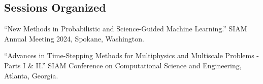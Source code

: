 \documentclass[11pt,letterpaper]{report}
\begin{document}



    \subsection*{Sessions Organized}

    \begin{tablist}

        \item[2024] \tab{}\enquote{New Methods in Probabilistic and Science-Guided Machine Learning.}
        SIAM Annual Meeting 2024, Spokane, Washington.

        \item[2021] \tab{}\enquote{Advances in Time-Stepping Methods for Multiphysics and Multiscale Problems - Parts I \& II.}
        SIAM Conference on Computational Science and Engineering, Atlanta, Georgia.

    \end{tablist}





\end{document}
